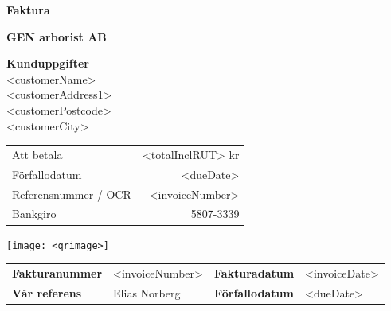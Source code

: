 \documentclass[a4paper,11pt]{extarticle}
\begin{document}
\pagestyle{fancy}
\fancyhf{} %
\renewcommand{\headrulewidth}{0pt}
\renewcommand{\footrulewidth}{0pt}

\setlength{\fboxsep}{1.5em}
\setlength{\parindent}{0pt}

\begin{minipage}[b]{0.4\textwidth}
\raggedright
{\color{Primary}
\fontsize{36}{0}\selectfont
\textbf{Faktura}}
\end{minipage}%
\begin{minipage}[b]{0.6\textwidth}
\raggedleft
{\color{Secondary}
\fontsize{36}{0}\selectfont
\textbf{GEN arborist AB}}
\end{minipage}

\vspace{2em}
\parbox{0.3\textwidth}{
\begin{tcolorbox}[height=3cm,valign=center]
    \textbf{Kunduppgifter} \\
    <customerName>\\
    <customerAddress1>\\
    <customerPostcode>\\
    <customerCity>\\
\end{tcolorbox}
}%
\hfill
\parbox{0.67\textwidth}{%
\begin{tcolorbox}[height=3cm,valign=center]
\parbox{0.45\textwidth}{%
\large\color{Primary}
\begin{tabularx}{\textwidth}{@{}lr}
    Att betala & <totalInclRUT> kr \\
    Förfallodatum & <dueDate> \\
    Referensnummer / OCR & <invoiceNumber> \\
    Bankgiro & 5807-3339 \\
\end{tabularx}
}\hfill\parbox{2.5cm}{\texttt{[image: <qrimage>]}}
\end{tcolorbox}
}

\vspace{1em}

\renewcommand\arraystretch{1.5}
{\small
\begin{tabularx}{\linewidth}{XlXl}
    \textbf{Fakturanummer} & <invoiceNumber> & \textbf{Fakturadatum} & <invoiceDate> \\
    \textbf{Vår referens} & Elias Norberg & \textbf{Förfallodatum} & <dueDate> \\
\end{tabularx}
}
\end{document}

